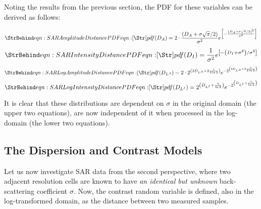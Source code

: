 Noting the results from the previous section, the PDF for these variables can be derived as follows:

\begin{equation}
  \label{eqn:SAR Amplitude Distance PDF}
  \caption{eqn:SAR Amplitude Distance PDF}
pdf(D_A) = 2 \cdot \frac{\left( D_A + \sigma \sqrt{\pi}/2 \right)}{\sigma^2}e^{ \left[ - \frac{\left( D_A + \sigma \sqrt{\pi}/2 \right)^2}{\sigma^2}   \right] }
\end{equation}
\begin{equation}
  \label{eqn:SAR Intensity Distance PDF}
  \caption{eqn:SAR Intensity Distance PDF}
pdf(D_I) = \frac{1}{\sigma^2}e^{\left[ -\left( D_I + \sigma^2 \right) / \sigma^2 \right] } \\
\end{equation}
\begin{equation}
  \label{eqn:SAR Log Amplitude Distance PDF}
  \caption{eqn:SAR Log Amplitude Distance PDF}
pdf(D_{L^A}) = 2 \cdot 2^{\left( 2 D_{L^A} + 2 \frac{\gamma}{2 \ln2} \right)} e^{-2^{\left( 2 D_{L^A} + 2 \frac{\gamma}{2 \ln2} \right)}}
\end{equation}
\begin{equation}
  \label{eqn:SAR Log Intensity Distance PDF}
  \caption{eqn:SAR Log Intensity Distance PDF}
pdf(D_{L^I}) = 2^{\left( D_{L^I} + \frac{\gamma}{\ln2} \right)} e^{-2^{\left( D_{L^I} + \frac{\gamma}{\ln2} \right)}}
\end{equation}

It is clear that these distributions are dependent on $\sigma$ in the original domain (the upper two equations), are now independent of it when processed in the log-domain (the lower two equations).

\subsection{The Dispersion and Contrast Models}

Let us now investigate SAR data from the second perspective,
  where two adjacent resolution cells are known to have \textit{an identical but unknown} back-scattering coefficient $\sigma$.
Now, the contrast random variable is defined, also in the log-transformed domain, as the distance between two measured samples.

